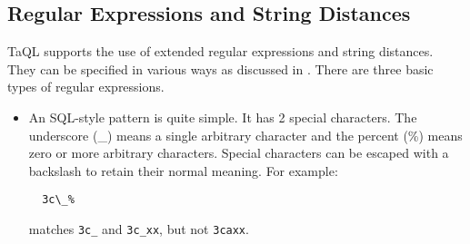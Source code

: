 \subsection{\label{TAQL:REGEX}Regular Expressions and String Distances}
TaQL supports the use of extended regular expressions and string distances. They can be
specified in various ways as discussed in
.
There are three basic types of regular expressions.
\begin{itemize}
\item An SQL-style pattern is quite simple. It has 2 special
  characters. The underscore (\_) means a single arbitrary character
  and the percent (\%) means zero or more arbitrary characters.
  Special characters can be escaped with a backslash to retain their
  normal meaning.
  For example:
\begin{verbatim}
  3c\_%
\end{verbatim}
matches \texttt{3c\_} and \texttt{3c\_xx}, but not \texttt{3caxx}.


\end{itemize}
